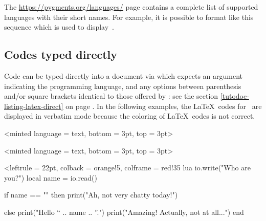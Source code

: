 \documentclass{tutodoc}
\begin{document}
\medskip

\begin{tdocnote}
	The \url{https://pygments.org/languages/} page contains a complete list of supported languages with their short names.
	For example, it is possible to format \brainfuck like this sequence  which is used to display \,.
\end{tdocnote}



\subsection{Codes typed directly}

Code can be typed directly into a document via  which expects an argument indicating the programming language, and any options between parenthesis and/or square brackets identical to those offered by : see the section \ref{tutodoc-listing-latex-direct} on page \pageref{tutodoc-listing-latex-direct}.
In the following examples, the \LaTeX\ codes for \thisproj\ are displayed in verbatim mode because the coloring of \LaTeX\ codes is not correct.

\begin{tdocexa}
	\leavevmode

    \begin{tdoclatex}<minted language = text, bottom = 3pt, top = 3pt>
    \end{tdoclatex}
\end{tdocexa}


\begin{tdocexa}
	\leavevmode

    \begin{tdoclatex}<minted language = text, bottom = 3pt, top = 3pt>
\begin{tdoccode}[style = solarized-light, linenos]%
                <leftrule = 22pt, colback = orange!5, colframe = red!35%
                {lua}
io.write("Who are you?")
local name = io.read()

if name == "" then
    print("Ah, not very chatty today!")

else
    print("Hello “ .. name .. ”.")
    print("Amazing! Actually, not at all...")
end
\end{tdoccode}
    \end{tdoclatex}
\end{tdocexa}
\end{document}
